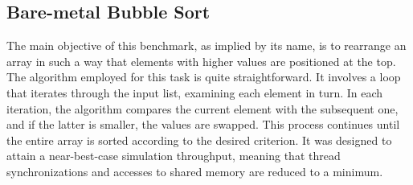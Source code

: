 \begin{table}[!htb]
    \caption{System Configurations}
    \begin{minipage}{.5\linewidth}
      \centering
        \label{tab:hostSystemConfig}
    \end{minipage}%
    \begin{minipage}{.5\linewidth}
        \centering
        \label{tab:targetSystemConfig}
    \end{minipage} 
\end{table}

\subsection{Bare-metal Bubble Sort}

The main objective of this benchmark, as implied by its name, is to rearrange an array in such a way that elements with higher values are 
positioned at the top. The algorithm employed for this task is quite straightforward. It involves a loop that iterates through the input list, 
examining each element in turn. In each iteration, the algorithm compares the current element with the subsequent one, and if the latter is 
smaller, the values are swapped. This process continues until the entire array is sorted according to the desired criterion. It was designed 
to attain a near-best-case simulation throughput, meaning that thread synchronizations and accesses to shared memory are reduced to a minimum.

